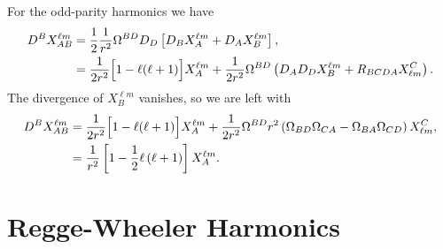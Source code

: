 \documentclass{article}
\begin{document}
For the odd-parity harmonics we have
\begin{align}
D^{B} X_{AB}^{\ell m} 
& = \frac{1}{2} \frac{1}{r^{2}} 
\Omega^{BD} D_{D} \left[ D_{B} X_{A}^{\ell m} + D_{A} X_{B}^{\ell m} \right], \\
& = \frac{1}{2r^{2}}\Big[ 1- \ell (\ell+1) \Big] X^{\ell m}_{A} 
+ \frac{1}{2r^{2}}  \Omega^{BD} \left( D_{A} D_{D} X_{B}^{\ell m}
+ R_{BCDA} X_{\ell m}^{C} \right).
\end{align}
The divergence of $X_{B}^{\ell m}$ vanishes, so we are left with
\begin{align}
D^{B} X^{\ell m}_{AB} 
& = \frac{1}{2r^{2}}\Big[ 1- \ell (\ell+1) \Big] X^{\ell m}_{A} 
+ \frac{1}{2r^{2}}  \Omega^{BD}
r^{2} \left( \Omega_{BD} \Omega_{CA} - \Omega_{BA} \Omega_{CD} \right) X_{\ell m}^{C}, \\
&=  \frac{1}{r^{2}} \left[ 1 - \frac{1}{2} \ell \left( \ell + 1 \right)  \right] 
X^{\ell m}_{A}.
\end{align}

\section{Regge-Wheeler Harmonics}

\label{reggewheeler}
\end{document}
